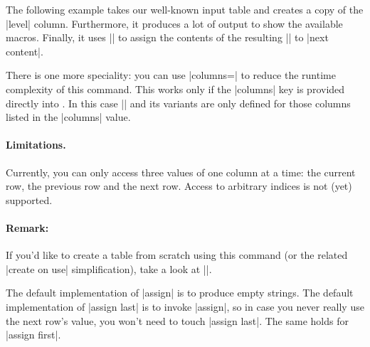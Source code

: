 \begin{command}{\pgfplotstablecreatecol{}}
The following example takes our well-known input table and creates a copy of the |level| column. Furthermore, it produces a lot of output to show the available macros. Finally, it uses |\pgfkeyslet| to assign the contents of the resulting |\entry| to |next content|.
\begin{codeexample}[]
\table
{}\table

\pgfplotstabletypeset[
	column type=l,
	columns={level,new},
	columns/new/.style={string type}
]\table
\end{codeexample}

There is one more speciality: you can use |columns=| to reduce the runtime complexity of this command. This works only if the |columns| key is provided directly into . In this case |\thisrow| and its variants are only defined for those columns listed in the |columns| value.

\paragraph{Limitations.} Currently, you can only access three values of one column at a time: the current row, the previous row and the next row. Access to arbitrary indices is not (yet) supported.

\paragraph{Remark:} If you'd like to create a table from scratch using this command (or the related |create on use| simplification), take a look at |\pgfplotstablenew|.

The default implementation of |assign| is to produce empty strings. The default implementation of |assign last| is to invoke |assign|, so in case you never really use the next row's value, you won't need to touch |assign last|. The same holds for |assign first|.
\end{command}

